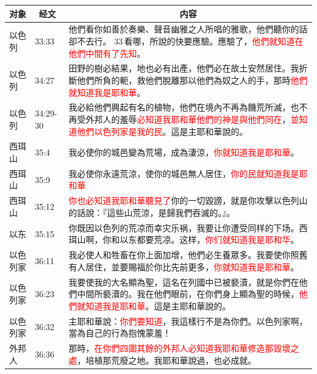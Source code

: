 \begin{table}[H]
\centering
\begin{tabular}{p{1.5cm}|p{}|p{13.0cm}}\hline\hline
\multicolumn{1}{c|}{对象}&\multicolumn{1}{c|}{经文}&\multicolumn{1}{c}{内容}\\\hline
以色列&33:33&他們看你如善於奏樂、聲音幽雅之人所唱的雅歌，他們聽你的話卻不去行。 33 看哪，所說的快要應驗。應驗了，\textcolor{red}{他們就知道在他們中間有了先知}。\\\hline

以色列&34:27&田野的樹必結果，地也必有出產，他們必在故土安然居住。我折斷他們所負的軛，救他們脫離那以他們為奴之人的手，那時\textcolor{red}{他們就知道我是耶和華}。\\\hline

以色列&34:29-30&我必給他們興起有名的植物，他們在境內不再為饑荒所滅，也不再受外邦人的羞辱\textcolor{red}{必知道我耶和華他們的神是與他們同在}，\textcolor{red}{並知道他們以色列家是我的民}。這是主耶和華說的。\\\hline


西珥山&35:4&我必使你的城邑變為荒場，成為淒涼，\textcolor{red}{你就知道我是耶和華}。\\\hline

西珥山&35:9&我必使你永遠荒涼，使你的城邑無人居住，\textcolor{red}{你的民就知道我是耶和華}\\\hline

西珥山&35:12&\textcolor{red}{你也必知道我耶和華聽見了}你的一切毀謗，就是你攻擊以色列山的話說：『這些山荒涼，是歸我們吞滅的。』。\\\hline

以东&35:15&你既因以色列的荒凉而幸灾乐祸，我要让你遭受同样的下场。西珥山啊，你和以东都要荒凉。这样，\textcolor{red}{你们就知道我是耶和华}。\\\hline 


以色列家&36:11&我必使人和牲畜在你上面加增，他們必生養眾多。我要使你照舊有人居住，並要賜福於你比先前更多，\textcolor{red}{你就知道我是耶和華}。\\\hline 


以色列家&36:23&我要使我的大名顯為聖，這名在列國中已被褻瀆，就是你們在他們中間所褻瀆的。我在他們眼前，在你們身上顯為聖的時候，\textcolor{red}{他們就知道我是耶和華}。這是主耶和華說的。\\\hline 

以色列家&36:32&主耶和華說：\textcolor{red}{你們要知道}，我這樣行不是為你們。以色列家啊，當為自己的行為抱愧蒙羞！\\\hline 


外邦人&36:36&那時，\textcolor{red}{在你們四圍其餘的外邦人必知道我耶和華修造那毀壞之處}，培植那荒廢之地。我耶和華說過，也必成就。\\\hline 


\end{tabular}
\end{table}
